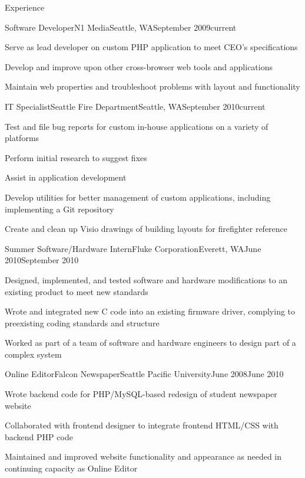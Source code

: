 \documentclass[letterpaper,10pt]{article}
\newcommand{\optarg}[2][]{%
  \ifthenelse{\isempty{#1}}%
    {}%
    {#2}%
}
\newenvironment{res_section}[1]{%
  \vskip 6pt
  \noindent
  {\Large \textbf{#1}}\\
  \rule[8pt]{\textwidth}{0.5pt}
  \vskip -8pt
}{
}
\newenvironment{res_subsection}[1]{%
  \vskip 4pt
  \noindent
  \textbf{\large{#1}}
  \begin{itemize}
}{
  \end{itemize}
}
\newenvironment{res_experienceitem}[5]{%
  \begin{res_subsection}{#1 - \em{%
  #2%
  \optarg[#3]{, #3}%
  \optarg[#4]{, #4}%
  \optarg[#5]{ -- #5}%
  }}
}{
  \end{res_subsection}
}
\begin{document}
\begin{res_section}{Experience}
\begin{res_experienceitem}{Software Developer}{N1 Media}{Seattle, WA}{September 2009}{current}
  \item Serve as lead developer on custom PHP application to meet CEO's specifications
  \item Develop and improve upon other cross-browser web tools and applications
  \item Maintain web properties and troubleshoot problems with layout and functionality
\end{res_experienceitem}
\begin{res_experienceitem}{IT Specialist}{Seattle Fire Department}{Seattle, WA}{September 2010}{current}
  \item Test and file bug reports for custom in-house applications on a variety of platforms
  \item Perform initial research to suggest fixes
  \item Assist in application development
  \item Develop utilities for better management of custom applications, including implementing a Git repository
  \item Create and clean up Visio drawings of building layouts for firefighter reference
\end{res_experienceitem}
\begin{res_experienceitem}{Summer Software/Hardware Intern}{Fluke Corporation}{Everett, WA}{June 2010}{September 2010}
  \item Designed, implemented, and tested software and hardware modifications to an existing product to meet new standards
  \item Wrote and integrated new C code into an existing firmware driver, complying to preexisting coding standards and structure
  \item Worked as part of a team of software and hardware engineers to design part of a complex system
\end{res_experienceitem}
\begin{res_experienceitem}{Online Editor}{Falcon Newspaper}{Seattle Pacific University}{June 2008}{June 2010}
  \item Wrote backend code for PHP/MySQL-based redesign of student newspaper website
  \item Collaborated with frontend designer to integrate frontend HTML/CSS with backend PHP code
  \item Maintained and improved website functionality and appearance as needed in continuing capacity as Online Editor

\end{res_experienceitem}
\end{res_section}
\end{document}

